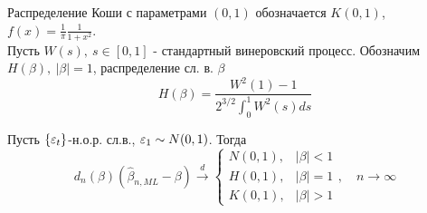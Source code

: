Распределение Коши с параметрами $(0,1)$ обозначается $K(0,1)$, $f(x)=\frac{1}{\pi}\frac{1}{1+x^2}$. \\
Пусть $W(s),\ s\in[0,1]$ - стандартный винеровский процесс.
Обозначим $H(\beta),\ \left\lvert \beta\right\rvert =1$, распределение сл. в. $\beta$
\[H(\beta)=\frac{W^2(1)-1}{2^{3/2}\int_0^1W^2(s)ds}\]
\begin{theorem}
    Пусть $\{\varepsilon_t\}$-н.о.р. сл.в., $\varepsilon_1\sim N(0,1)$. Тогда
    \[d_n(\beta)(\widehat{\beta}_{n,ML}-\beta)\xrightarrow{d}\begin{cases}
        N(0,1),& \left\lvert \beta\right\rvert <1 \\
        H(0,1),& \left\lvert \beta\right\rvert =1 \\
        K(0,1),& \left\lvert \beta\right\rvert >1 
    \end{cases}, \quad n\rightarrow\infty\]
\end{theorem}
